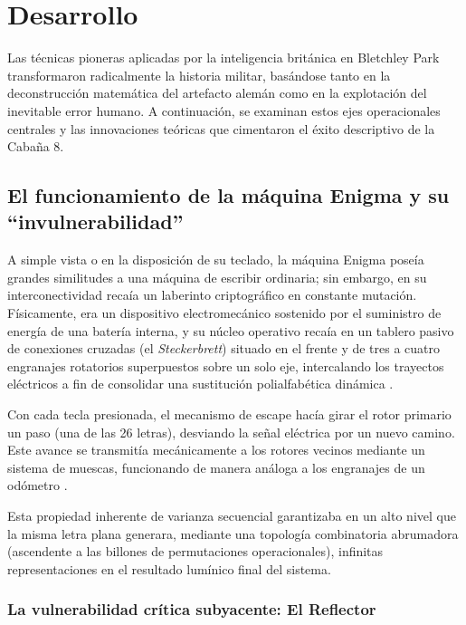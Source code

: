 \section{Desarrollo}

Las técnicas pioneras aplicadas por la inteligencia británica en Bletchley Park transformaron radicalmente la historia militar, basándose tanto en la deconstrucción matemática del artefacto alemán como en la explotación del inevitable error humano. A continuación, se examinan estos ejes operacionales centrales y las innovaciones teóricas que cimentaron el éxito descriptivo de la Cabaña 8.

\subsection{El funcionamiento de la máquina Enigma y su ``invulnerabilidad''}

A simple vista o en la disposición de su teclado, la máquina Enigma poseía grandes similitudes a una máquina de escribir ordinaria; sin embargo, en su interconectividad recaía un laberinto criptográfico en constante mutación. Físicamente, era un dispositivo electromecánico sostenido por el suministro de energía de una batería interna, y su núcleo operativo recaía en un tablero pasivo de conexiones cruzadas (el \textit{Steckerbrett}) situado en el frente y de tres a cuatro engranajes rotatorios superpuestos sobre un solo eje, intercalando los trayectos eléctricos a fin de consolidar una sustitución polialfabética dinámica \cite{copeland2004essential}.

Con cada tecla presionada, el mecanismo de escape hacía girar el rotor primario un paso (una de las 26 letras), desviando la señal eléctrica por un nuevo camino. Este avance se transmitía mecánicamente a los rotores vecinos mediante un sistema de muescas, funcionando de manera análoga a los engranajes de un odómetro \cite{copeland2004essential}.

Esta propiedad inherente de varianza secuencial garantizaba en un alto nivel que la misma letra plana generara, mediante una topología combinatoria abrumadora (ascendente a las billones de permutaciones operacionales), infinitas representaciones en el resultado lumínico final del sistema.

\subsubsection{La vulnerabilidad crítica subyacente: El Reflector}

